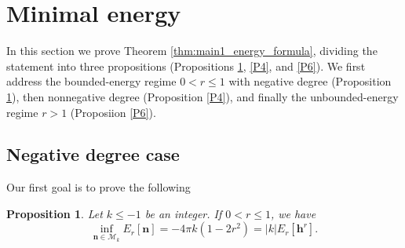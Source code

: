 \documentclass{amsart}
\numberwithin{equation}{section}
\newtheorem{proposition}[theorem]{Proposition}
\newtheorem{corollary}[theorem]{Corollary}
\theoremstyle{definition}
\theoremstyle{remark}
\newcommand{\R}{\mathbb{R}}
\newcommand{\boM}{\mathcal{M}}
\newcommand{\te}{\ensuremath{\theta}}
\newcommand{\bh}{{\mathbf{h}}}
\newcommand{\bn}{{\mathbf{n}}}
\begin{document}
\section{Minimal energy}\label{sec:minimal_energy}

In this section we prove Theorem \ref{thm:main1_energy_formula}, dividing the statement into three propositions (Propositions \ref{P2}, \ref{P4}, and \ref{P6}).
We first address the bounded-energy regime $0<r\leq1$ with negative degree (Proposition \ref{P2}), then nonnegative degree (Proposition \ref{P4}), and finally the unbounded-energy regime $r>1$ (Proposiion \ref{P6}).

\subsection{Negative degree case}

Our first goal is to prove the following

\begin{proposition}\label{P2}
Let $k\le -1$ be an integer. If $0<r\le 1$, we have
$$
\inf_{\bn\in\boM_{k}} E_r[\bn] = -4\pi k (1-2r^2) 
= |k|E_r[\bh^r].
$$
\end{proposition}
%
%
%
%
%
\end{document}
